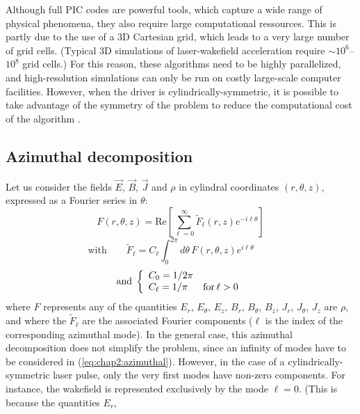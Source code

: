 \documentclass[]{report}
\begin{document}
Although full PIC codes are powerful tools, which capture a wide range
of physical phenomena, they also require large computational ressources.
This is partly due to the use of a 3D Cartesian grid, which
leads to a very large number of grid cells. (Typical 3D simulations of
laser-wakefield acceleration require $\sim 10^6$--$ 10^8$ grid
cells.) For this reason, these algorithms need to be highly parallelized, and
high-resolution simulations can only be run on costly large-scale
computer facilities. However, when the driver is
cylindrically-symmetric, it is possible to take advantage of the
symmetry of the problem to reduce the computational cost of the algorithm \cite{godfrey1985iprop,LifschitzJCP2009,DavidsonJCP2015,Lehe2016}.

\subsection{Azimuthal decomposition}
Let us consider the fields $\vec{E}$, $\vec{B}$, $\vec{J}$ and $\rho$
 in cylindral coordinates $(r,\theta,z)$, expressed as a Fourier series in $\theta$:
%
\begin{equation}
F(r,\theta,z) = \mathrm{Re}\left[ \sum_{\ell=0}^\infty
  \tilde{F}_{\ell}(r,z) e^{-i\ell\theta} \right]
\label{eq:chap2:azimuthal}
\end{equation}
%
\begin{equation}
\mathrm{with} \qquad \tilde{F}_{\ell} = C_\ell \int_0^{2\pi} d\theta
\,F(r,\theta,z)e^{i\ell\theta} \qquad
\label{eq:chap2:Fourier-coeffs}
\end{equation}
\begin{equation}
\mathrm{and} \;
\left \{ \begin{array}{l l}
C_{0} = 1/2\pi &\\
C_\ell = 1/\pi &\mathrm{for}\,\ell > 0
\end{array} \right.
\end{equation}
%
where $F$ represents any of the quantities $E_r$,
$E_\theta$, $E_z$, $B_r$, $B_\theta$, $B_z$, $J_r$, $J_\theta$, $J_z$
are $\rho$, and where the
$\tilde{F}_\ell$ are the associated Fourier components ($\ell$ is the
index of the corresponding azimuthal mode). In the general case, this
azimuthal decomposition does not simplify the problem, since an
infinity of modes have to be considered in (\ref{eq:chap2:azimuthal}). However, in the case of a
cylindrically-symmetric laser pulse, only the very first modes have
non-zero components. For instance, the wakefield is represented
exclusively by the mode $\ell = 0$. (This is because the quantities $E_r$,
\end{document}
